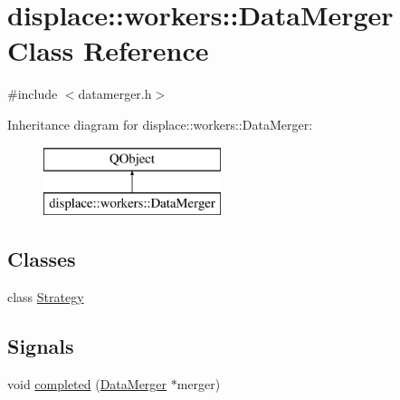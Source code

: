 \hypertarget{classdisplace_1_1workers_1_1_data_merger}{}\section{displace\+::workers\+::Data\+Merger Class Reference}
\label{classdisplace_1_1workers_1_1_data_merger}


{\ttfamily \#include $<$datamerger.\+h$>$}

Inheritance diagram for displace\+::workers\+::Data\+Merger\+:\begin{figure}[H]
\begin{center}
\leavevmode
\includegraphics[height=2.000000cm]{df/da1/classdisplace_1_1workers_1_1_data_merger}
\end{center}
\end{figure}
\subsection*{Classes}
\begin{DoxyCompactItemize}
\item 
class \mbox{\hyperlink{classdisplace_1_1workers_1_1_data_merger_1_1_strategy}{Strategy}}
\end{DoxyCompactItemize}
\subsection*{Signals}
\begin{DoxyCompactItemize}
\item 
void \mbox{\hyperlink{classdisplace_1_1workers_1_1_data_merger_aae9f7ad27c89e67c07ab0a285198afaa}{completed}} (\mbox{\hyperlink{classdisplace_1_1workers_1_1_data_merger}{Data\+Merger}} $\ast$merger)
\end{DoxyCompactItemize}
